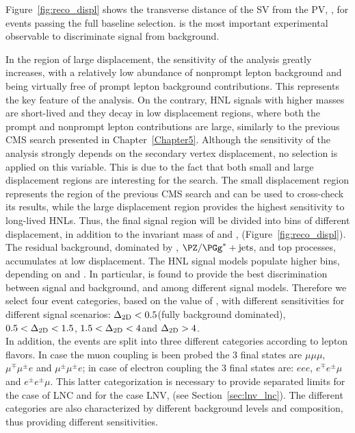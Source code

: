 Figure~\ref{fig:reco_displ} shows the transverse
distance of the SV from the PV, \Deltwod, for events
passing the full baseline selection. \Deltwod is the most important
experimental observable to discriminate signal from background.

In the region of large displacement, the sensitivity of the analysis
greatly increases, with a relatively low abundance of nonprompt lepton
background and being virtually free of prompt lepton background
contributions. This represents the key feature of the analysis.
On the contrary, HNL signals with higher masses are short-lived and
they decay in low displacement regions, where both the prompt and
nonprompt lepton contributions are large, similarly to the previous
CMS search presented in Chapter~\ref{Chapter5}.
Although the sensitivity of the analysis strongly depends on the
secondary vertex displacement, no selection is applied on this
variable. This is due to the fact that both small and large
displacement regions are interesting for the search. The small
displacement region represents the region of the previous CMS search
and can be used to cross-check its results, while the large
displacement region provides the highest sensitivity to long-lived
HNLs. 
Thus, the final signal region will be divided into bins of different
displacement, in addition to the invariant mass of \ltwo and \lthree,
\mtwol (Figure~\ref{fig:reco_displ}).\\

The residual background, dominated by \Xg,
$\PZ/\PGg^{\ast}+\mathrm{jets}$, and top processes, accumulates at low
displacement. The HNL signal models populate higher \Deltwod bins, depending on \mhnl and \mixpar. In particular, \Deltwod
is found to provide the best discrimination between signal and
background, and among different signal models.
Therefore we select four event categories, based on the value of
\Deltwod, with different sensitivities for different signal
scenarios:
$\Delta_{\mathrm{2D}}<0.5$\cm (fully background dominated), $0.5<\Delta_{\mathrm{2D}}<1.5$\cm,
$1.5<\Delta_{\mathrm{2D}}<4$\cm and $\Delta_{\mathrm{2D}}>4$\cm.\\
In addition, the events are split into three different categories
according to lepton flavors. In case 
the muon coupling is been probed the 3 final states are $\mu\mu\mu$,  $\mu^{\mp}\mu^{\pm} e$ 
and $\mu^{\pm}\mu^{\pm}e$; in case of electron coupling the 3 final states
are: $eee$,  $e^{\mp}e^{\pm}\mu$ and $e^{\pm}e^{\pm}\mu$. This latter categorization
is necessary to provide separated limits for the case of LNC 
and for the case LNV, (see Section~\ref{sec:lnv_lnc}).
The different categories are also characterized by different
background levels and composition, thus providing different
sensitivities.


